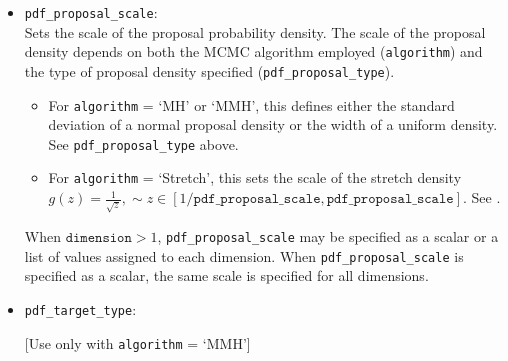 \begin{itemize}
\item \texttt{pdf\_proposal\_scale}:\\ 
	Sets the scale of the proposal probability density. The scale of the proposal density depends on both the MCMC algorithm employed (\texttt{algorithm}) and the type of proposal 		density specified (\texttt{pdf\_proposal\_type}).
	\begin{itemize}
		\item For \texttt{algorithm} = `MH' or `MMH', this defines either the standard deviation of a normal proposal density or the width of a uniform density. See 							\texttt{pdf\_proposal\_type} above.
		\item For \texttt{algorithm} = `Stretch', this sets the scale of the stretch density $g(z)=\frac{1}{\sqrt{z}},\sim z\in[1/\texttt{pdf\_proposal\_scale}, \texttt{pdf\_proposal\_scale}]$. See 		\cite{Goodman2010}.
	\end{itemize}
	When $\texttt{dimension}>1$, \texttt{pdf\_proposal\_scale} may be specified as a scalar or a list of values assigned to each dimension. When \texttt{pdf\_proposal\_scale} is specified 	as a scalar, the same scale is specified for all dimensions. 
\item \texttt{pdf\_target\_type}: 

	[Use only with \texttt{algorithm} = `MMH']\\ 
	

\end{itemize}
